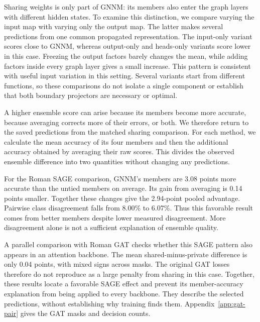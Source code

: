 \documentclass{article}
\begin{document}
Sharing weights is only part of GNNM: its members also enter the graph layers with different hidden states. To examine this distinction, we compare varying the input map with varying only the output map. The latter makes several predictions from one common propagated representation. The input-only variant scores close to GNNM, whereas output-only and heads-only variants score lower in this case. Freezing the output factors barely changes the mean, while adding factors inside every graph layer gives a small increase. This pattern is consistent with useful input variation in this setting. Several variants start from different functions, so these comparisons do not isolate a single component or establish that both boundary projectors are necessary or optimal.

A higher ensemble score can arise because its members become more accurate, because averaging corrects more of their errors, or both. We therefore return to the saved predictions from the matched sharing comparison. For each method, we calculate the mean accuracy of its four members and then the additional accuracy obtained by averaging their raw scores. This divides the observed ensemble difference into two quantities without changing any predictions.

For the Roman SAGE comparison, GNNM's members are 3.08 points more accurate than the untied members on average. Its gain from averaging is 0.14 points smaller. Together these changes give the 2.94-point pooled advantage. Pairwise class disagreement falls from 8.00\% to 6.07\%. Thus this favorable result comes from better members despite lower measured disagreement. More disagreement alone is not a sufficient explanation of ensemble quality.

A parallel comparison with Roman GAT checks whether this SAGE pattern also appears in an attention backbone. The mean shared-minus-private difference is only 0.04 points, with mixed signs across masks. The original GAT losses therefore do not reproduce as a large penalty from sharing in this case. Together, these results locate a favorable SAGE effect and prevent its member-accuracy explanation from being applied to every backbone. They describe the selected predictions, without establishing why training finds them. Appendix~\ref{app:gat-pair} gives the GAT masks and decision counts.


\end{document}

